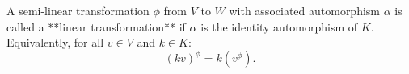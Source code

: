 A semi-linear transformation $\phi$ from $V$ to $W$ with associated automorphism $\alpha$ is called a **linear transformation** if $\alpha$ is the identity automorphism of $K$. Equivalently, for all $v \in V$ and $k \in K$:
$$(kv)^\phi = k(v^\phi).$$
